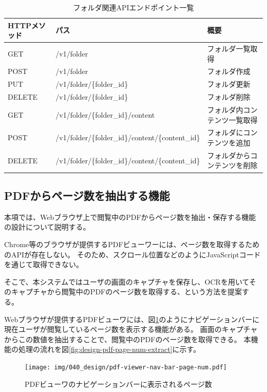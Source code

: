 \begin{table}[htbp]
  \label{tb:design-folder-api}
  \caption{フォルダ関連APIエンドポイント一覧}
  \begin{center}
    \begin{tabular}{|l|l|l|}
      \hline
      HTTPメソッド & パス & 概要 \\\hline\hline
      GET & /v1/folder & フォルダ一覧取得 \\\hline
      POST & /v1/folder & フォルダ作成 \\\hline
      PUT & /v1/folder/\{folder\_id\} & フォルダ更新 \\\hline
      DELETE & /v1/folder/\{folder\_id\} & フォルダ削除 \\\hline
      GET & /v1/folder/\{folder\_id\}/content & フォルダ内コンテンツ一覧取得 \\\hline
      POST & /v1/folder/\{folder\_id\}/content/\{content\_id\} & フォルダにコンテンツを追加 \\\hline
      DELETE & /v1/folder/\{folder\_id\}/content/\{content\_id\} & フォルダからコンテンツを削除 \\\hline
    \end{tabular}
  \end{center}
\end{table}

\subsection{PDFからページ数を抽出する機能}
本項では、Webブラウザ上で閲覧中のPDFからページ数を抽出・保存する機能の設計について説明する。

Chrome等のブラウザが提供するPDFビューワーには、ページ数を取得するためのAPIが存在しない。
そのため、スクロール位置などのようにJavaScriptコードを通じて取得できない。

そこで、本システムではユーザの画面のキャプチャを保存し、OCRを用いてそのキャプチャから閲覧中のPDFのページ数を取得する、という方法を提案する。

Webブラウザが提供するPDFビューワには、図\ref{fig:pdf-viewer-nav-bar-page-num}のようにナビゲーションバーに現在ユーザが閲覧しているページ数を表示する機能がある。
画面のキャプチャからこの数値を抽出することで、閲覧中のPDFのページ数を取得できる。
本機能の処理の流れを図\ref{fig:design-pdf-page-num-extract}に示す。

\begin{figure}[htbp]
  \caption{PDFビューワのナビゲーションバーに表示されるページ数}
  \label{fig:pdf-viewer-nav-bar-page-num}
  \begin{center}
    \texttt{[image: img/040\_design/pdf-viewer-nav-bar-page-num.pdf]}
  \end{center}
\end{figure}

